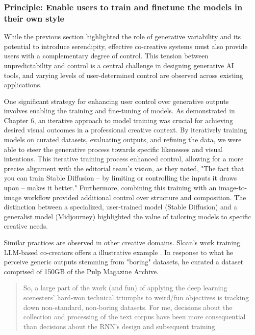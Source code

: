 \subsubsection{Principle: Enable users to train and finetune the models in their own style}

While the previous section highlighted the role of generative variability and its potential to introduce serendipity, effective co-creative systems must also provide users with a complementary degree of control. This tension between unpredictability and control is a central challenge in designing generative AI tools, and varying levels of user-determined control are observed across existing applications.

One significant strategy for enhancing user control over generative outputs involves enabling the training and fine-tuning of models. As demonstrated in Chapter 6, an iterative approach to model training was crucial for achieving desired visual outcomes in a professional creative context. By iteratively training models on curated datasets, evaluating outputs, and refining the data, we were able to steer the generative process towards specific likenesses and visual intentions. This iterative training process enhanced control, allowing for a more precise alignment with the editorial team's vision, as they noted, "The fact that you can train Stable Diffusion – by limiting or controlling the inputs it draws upon – makes it better." Furthermore, combining this training with an image-to-image workflow provided additional control over structure and composition. The distinction between a specialized, user-trained model (Stable Diffusion) and a generalist model (Midjourney) highlighted the value of tailoring models to specific creative needs.

Similar practices are observed in other creative domains. Sloan's work training LLM-based co-creators offers a illustrative example \cite{Sloan2016-fj}. In response to what he perceive generic outputs stemming from "boring" datasets, he curated a dataset comprised of 150GB of the Pulp Magazine Archive.

\begin{quote}
    So, a large part of the work (and fun) of applying the deep learning scenesters’ hard-won technical triumphs to weird/fun objectives is tracking down non-standard, non-boring datasets. For me, decisions about the collection and processing of the text corpus have been more consequential than decisions about the RNN’s design and subsequent training.
\end{quote}


